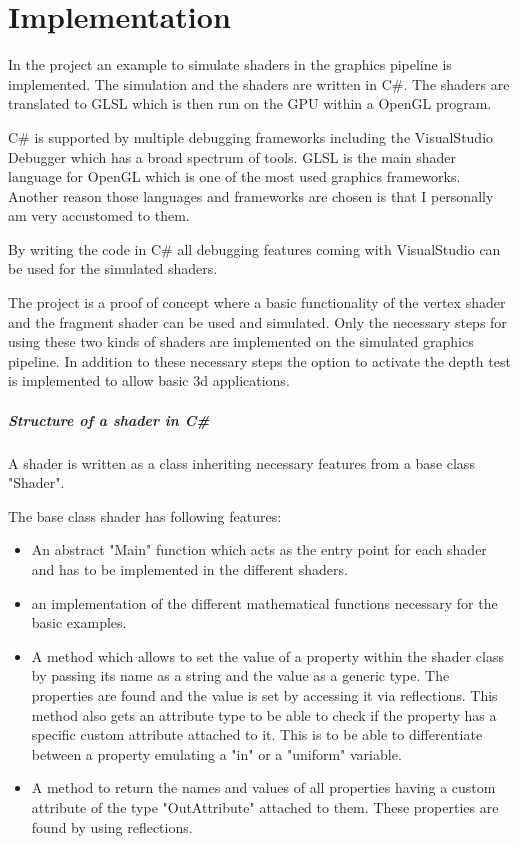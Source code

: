 
\chapter{Implementation}\label{cha:Implementation}

In the project  an example to simulate shaders in the graphics pipeline is implemented. The simulation and the shaders are written in C\#. The shaders are translated to GLSL which is then run on the GPU within a OpenGL program.

C\# is supported by multiple debugging frameworks including the VisualStudio Debugger which has a broad spectrum of tools.  GLSL is the main shader language for OpenGL which is one of the most used graphics frameworks. 
Another reason those languages and frameworks are chosen is that I personally am very accustomed to them.

By writing the code in C\# all debugging features coming with VisualStudio can be used for the simulated shaders.

The project is a proof of concept where a basic functionality of the vertex shader and the fragment shader can be used and simulated. Only the necessary steps for using these two kinds of shaders are implemented on the simulated graphics pipeline. In addition to these necessary steps the option to activate the depth test is implemented to allow basic 3d applications.

\paragraph{Structure of a shader in C\#}

A shader is written as a class inheriting necessary features from a base class "Shader".

The base class shader has following features:
\begin{itemize}
\item An abstract "Main" function which acts as the entry point for each shader and has to be implemented in the different shaders.
\item an implementation of the different mathematical functions necessary for the basic examples.
\item A method which allows to set the value of a property within the shader class by passing its name as a string and the value as a generic type. The properties are found and the value is set by accessing it via reflections. This method also gets an attribute type to be able to check if the property has a specific custom attribute attached to it. This is to be able to differentiate between a property emulating a "in" or a "uniform" variable.
\item A method to return the names and values of all properties having a custom attribute of the type "OutAttribute" attached to them. These properties are found by using reflections.
\end{itemize}

